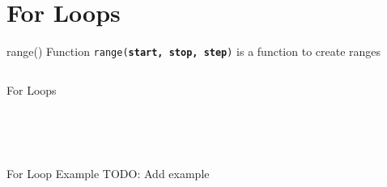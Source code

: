         \section{For Loops}
      
        \begin{frame}{range() Function}
            \pause
            \LARGE
            \texttt{range(\textbf{start, stop, step})} is a function to create ranges
            \bigskip
            \inputminted[frame=single,framesep=2pt]{python3}{../Lecture3/code-examples/range.py}
        \end{frame}
      
        \begin{frame}{For Loops}
            \pause
            \begin{columns}
                \begin{column}{0.5\textwidth}
                    \inputminted[frame=single,framesep=2pt]{python3}{../Lecture3/code-examples/for1.py}
                \end{column}
               \pause 
                \begin{column}{0.5\textwidth}
                    \inputminted[frame=single,framesep=2pt]{python3}{../Lecture3/code-examples/for2.py}
                    \pause
                    \inputminted[frame=single,framesep=2pt]{python3}{../Lecture3/code-examples/for3.py}
                    \pause
                    \inputminted[frame=single,framesep=2pt]{python3}{../Lecture3/code-examples/for4.py}
                \end{column} 
            \end{columns}
        \end{frame}
        
        \begin{frame}{For Loop Example}
            \huge
            TODO: Add example
        
        \end{frame}

